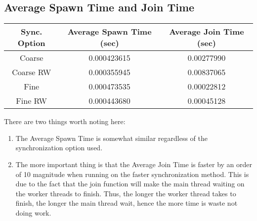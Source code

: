 \documentclass[11pt]{article}
\begin{document}
\subsection{Average Spawn Time and Join Time}
\begin{table}[H]
	\centering
	\begin{tabular}{|c|c|c|}
		\hline
		Sync. Option &Average Spawn Time (sec)	&Average Join Time (sec)	\\
		\hline
		Coarse &0.000423615	&0.00277990\\
		\hline
		Coarse RW	&0.000355945	&0.00837065\\
		\hline
		Fine	&0.000473535	&0.00022812\\
		\hline
		Fine RW	&0.000443680	&0.00045128\\
		\hline
	\end{tabular}
\end{table}
There are two things worth noting here:
\begin{enumerate}
	\item The Average Spawn Time is somewhat similar regardless of the synchronization option used.
	\item The more important thing is that the Average Join Time is faster by an order of 10 magnitude when running on the faster synchronization method. This is due to the fact that the join function will make the main thread waiting on the worker threads to finish. Thus, the longer the worker thread takes to finish, the longer the main thread wait, hence the more time is waste not doing work.
\end{enumerate}
\end{document}
